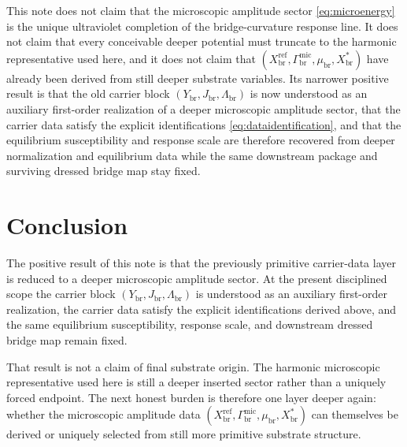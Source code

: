 \documentclass[11pt]{article}
\newcommand{\RespCarrier}{Y_{\mathrm{br}}}
\newcommand{\RespFlux}{J_{\mathrm{br}}}
\newcommand{\RespCompat}{\Lambda_{\mathrm{br}}}
\newcommand{\RespMicroEq}{X_{\mathrm{br}}^{\ast}}
\newcommand{\RespMicroRef}{X_{\mathrm{br}}^{\mathrm{ref}}}
\newcommand{\RespMicroFluxCoeff}{\Gamma_{\mathrm{br}}^{\mathrm{mic}}}
\newcommand{\RespMicroGap}{\mu_{\mathrm{br}}}
\begin{document}
This note does not claim that the microscopic amplitude sector \eqref{eq:microenergy} is the unique ultraviolet completion of the bridge-curvature response line. It does not claim that every conceivable deeper potential must truncate to the harmonic representative used here, and it does not claim that \((\RespMicroRef,\RespMicroFluxCoeff,\RespMicroGap,\RespMicroEq)\) have already been derived from still deeper substrate variables. Its narrower positive result is that the old carrier block \((\RespCarrier,\RespFlux,\RespCompat)\) is now understood as an auxiliary first-order realization of a deeper microscopic amplitude sector, that the carrier data satisfy the explicit identifications \eqref{eq:dataidentification}, and that the equilibrium susceptibility and response scale are therefore recovered from deeper normalization and equilibrium data while the same downstream package and surviving dressed bridge map stay fixed.

\section{Conclusion}

The positive result of this note is that the previously primitive carrier-data layer is reduced to a deeper microscopic amplitude sector. At the present disciplined scope the carrier block \((\RespCarrier,\RespFlux,\RespCompat)\) is understood as an auxiliary first-order realization, the carrier data satisfy the explicit identifications derived above, and the same equilibrium susceptibility, response scale, and downstream dressed bridge map remain fixed.

That result is not a claim of final substrate origin. The harmonic microscopic representative used here is still a deeper inserted sector rather than a uniquely forced endpoint. The next honest burden is therefore one layer deeper again: whether the microscopic amplitude data \((\RespMicroRef,\RespMicroFluxCoeff,\RespMicroGap,\RespMicroEq)\) can themselves be derived or uniquely selected from still more primitive substrate structure.
\end{document}

